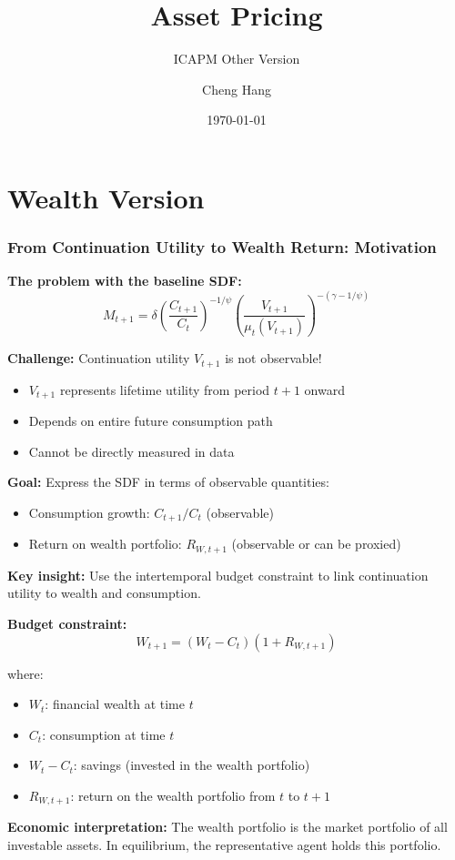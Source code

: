 \documentclass{beamer}
\title[Asset Pricing]{\textbf{Asset Pricing}} %
\subtitle{ICAPM Other Version}
\author[Cheng Hang]{Cheng Hang} %
\institute[DUFE] %
{School of Fintech \\
Dongbei University of Finance \& Economics \\ %
\medskip
\textbf{chenghangch@qq.com}%
}
\date{\today} %
\begin{document}
\begin{frame}
\titlepage %
\end{frame}


\section{Wealth Version}

\begin{frame}[allowframebreaks]
    \frametitle{From Continuation Utility to Wealth Return: Motivation}
    
    \textbf{The problem with the baseline SDF:}
    \begin{equation*}
        M_{t+1} = \delta \left( \frac{C_{t+1}}{C_t} \right)^{-1/\psi} \left( \frac{V_{t+1}}{\mu_t(V_{t+1})} \right)^{-(\gamma-1/\psi)}
    \end{equation*}
    
    \textbf{Challenge:} Continuation utility $V_{t+1}$ is not observable!
    \begin{itemize}
        \item $V_{t+1}$ represents lifetime utility from period $t+1$ onward
        \item Depends on entire future consumption path
        \item Cannot be directly measured in data
    \end{itemize}
    
    \textbf{Goal:} Express the SDF in terms of observable quantities:
    \begin{itemize}
        \item Consumption growth: $C_{t+1}/C_t$ (observable)
        \item Return on wealth portfolio: $R_{W,t+1}$ (observable or can be proxied)
    \end{itemize}
    
    \framebreak
    
    \textbf{Key insight:} Use the intertemporal budget constraint to link continuation utility to wealth and consumption.
    
    \textbf{Budget constraint:}
    \begin{equation*}
        W_{t+1} = (W_t - C_t)(1 + R_{W,t+1})
    \end{equation*}
    
    where:
    \begin{itemize}
        \item $W_t$: financial wealth at time $t$
        \item $C_t$: consumption at time $t$
        \item $W_t - C_t$: savings (invested in the wealth portfolio)
        \item $R_{W,t+1}$: return on the wealth portfolio from $t$ to $t+1$
    \end{itemize}
    
    \textbf{Economic interpretation:} The wealth portfolio is the market portfolio of all investable assets. In equilibrium, the representative agent holds this portfolio.
\end{frame}
\end{document}
